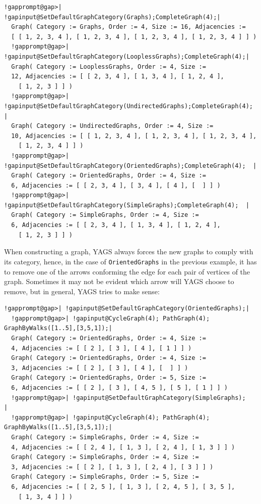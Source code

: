 \documentclass[a4paper,11pt]{report}
\begin{document}
{{ 
\begin{Verbatim}[commandchars=!@|,fontsize=\small,frame=single,label=Example]
  !gapprompt@gap>| !gapinput@SetDefaultGraphCategory(Graphs);CompleteGraph(4);|
  Graph( Category := Graphs, Order := 4, Size := 16, Adjacencies := 
  [ [ 1, 2, 3, 4 ], [ 1, 2, 3, 4 ], [ 1, 2, 3, 4 ], [ 1, 2, 3, 4 ] ] )
  !gapprompt@gap>| !gapinput@SetDefaultGraphCategory(LooplessGraphs);CompleteGraph(4);|
  Graph( Category := LooplessGraphs, Order := 4, Size := 
  12, Adjacencies := [ [ 2, 3, 4 ], [ 1, 3, 4 ], [ 1, 2, 4 ], 
    [ 1, 2, 3 ] ] )
  !gapprompt@gap>| !gapinput@SetDefaultGraphCategory(UndirectedGraphs);CompleteGraph(4);      |
  Graph( Category := UndirectedGraphs, Order := 4, Size := 
  10, Adjacencies := [ [ 1, 2, 3, 4 ], [ 1, 2, 3, 4 ], [ 1, 2, 3, 4 ], 
    [ 1, 2, 3, 4 ] ] )
  !gapprompt@gap>| !gapinput@SetDefaultGraphCategory(OrientedGraphs);CompleteGraph(4);  |
  Graph( Category := OrientedGraphs, Order := 4, Size := 
  6, Adjacencies := [ [ 2, 3, 4 ], [ 3, 4 ], [ 4 ], [  ] ] )
  !gapprompt@gap>| !gapinput@SetDefaultGraphCategory(SimpleGraphs);CompleteGraph(4);  |
  Graph( Category := SimpleGraphs, Order := 4, Size := 
  6, Adjacencies := [ [ 2, 3, 4 ], [ 1, 3, 4 ], [ 1, 2, 4 ], 
    [ 1, 2, 3 ] ] )
\end{Verbatim}
 

When constructing a graph, \textsf{YAGS} always forces the new graphs to comply with its category, hence, in the case
of \texttt{OrientedGraphs} in the previous example, it has to remove one of the arrows conforming the
edge for each pair of vertices of the graph. Sometimes it may not be evident
which arrow will \textsf{YAGS} choose to remove, but in general, \textsf{YAGS} tries to make sense: 

 
\begin{Verbatim}[commandchars=!@|,fontsize=\small,frame=single,label=Example]
  !gapprompt@gap>| !gapinput@SetDefaultGraphCategory(OrientedGraphs);|
  !gapprompt@gap>| !gapinput@CycleGraph(4); PathGraph(4); GraphByWalks([1..5],[3,5,1]);|
  Graph( Category := OrientedGraphs, Order := 4, Size := 
  4, Adjacencies := [ [ 2 ], [ 3 ], [ 4 ], [ 1 ] ] )
  Graph( Category := OrientedGraphs, Order := 4, Size := 
  3, Adjacencies := [ [ 2 ], [ 3 ], [ 4 ], [  ] ] )
  Graph( Category := OrientedGraphs, Order := 5, Size := 
  6, Adjacencies := [ [ 2 ], [ 3 ], [ 4, 5 ], [ 5 ], [ 1 ] ] )
  !gapprompt@gap>| !gapinput@SetDefaultGraphCategory(SimpleGraphs);                    |
  !gapprompt@gap>| !gapinput@CycleGraph(4); PathGraph(4); GraphByWalks([1..5],[3,5,1]);|
  Graph( Category := SimpleGraphs, Order := 4, Size := 
  4, Adjacencies := [ [ 2, 4 ], [ 1, 3 ], [ 2, 4 ], [ 1, 3 ] ] )
  Graph( Category := SimpleGraphs, Order := 4, Size := 
  3, Adjacencies := [ [ 2 ], [ 1, 3 ], [ 2, 4 ], [ 3 ] ] )
  Graph( Category := SimpleGraphs, Order := 5, Size := 
  6, Adjacencies := [ [ 2, 5 ], [ 1, 3 ], [ 2, 4, 5 ], [ 3, 5 ], 
    [ 1, 3, 4 ] ] )
\end{Verbatim}
 

}}
\end{document}
